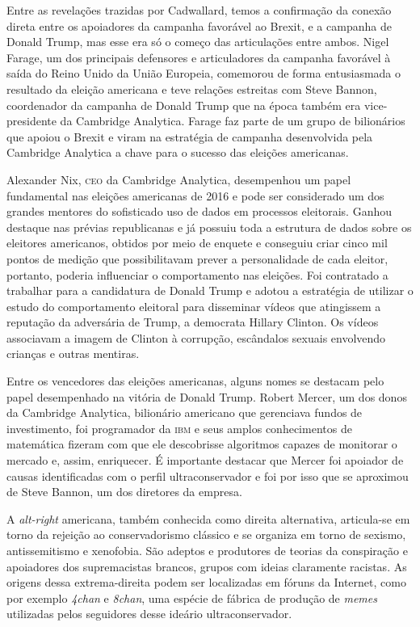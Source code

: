 Entre as revelações trazidas por Cadwallard, temos a confirmação da
conexão direta entre os apoiadores da campanha favorável ao Brexit, e a
campanha de Donald Trump, mas esse era só o começo das articulações
entre ambos. Nigel Farage, um dos principais defensores e articuladores
da campanha favorável à saída do Reino Unido da União Europeia,
comemorou de forma entusiasmada o resultado da eleição americana e teve
relações estreitas com Steve Bannon, coordenador da campanha de Donald
Trump que na época também era vice-presidente da Cambridge Analytica.
Farage faz parte de um grupo de bilionários que apoiou o Brexit e viram
na estratégia de campanha desenvolvida pela Cambridge Analytica a chave
para o sucesso das eleições americanas.

Alexander Nix, \textsc{ceo} da Cambridge Analytica, desempenhou um papel
fundamental nas eleições americanas de 2016 e pode ser considerado um
dos grandes mentores do sofisticado uso de dados em processos eleitorais.
Ganhou destaque nas prévias republicanas e já possuiu toda a estrutura
de dados sobre os eleitores americanos, obtidos por meio de enquete e
conseguiu criar cinco mil pontos de medição que possibilitavam prever a
personalidade de cada eleitor, portanto, poderia influenciar o
comportamento nas eleições. Foi contratado a trabalhar para a
candidatura de Donald Trump e adotou a estratégia de utilizar o estudo
do comportamento eleitoral para disseminar vídeos que atingissem a
reputação da adversária de Trump, a democrata Hillary Clinton. Os vídeos
associavam a imagem de Clinton à corrupção, escândalos sexuais
envolvendo crianças e outras mentiras.

Entre os vencedores das eleições americanas, alguns nomes se destacam
pelo papel desempenhado na vitória de Donald Trump. Robert Mercer, um
dos donos da Cambridge Analytica, bilionário americano que gerenciava
fundos de investimento, foi programador da \textsc{ibm} e seus amplos
conhecimentos de matemática fizeram com que ele descobrisse algoritmos
capazes de monitorar o mercado e, assim, enriquecer. É importante
destacar que Mercer foi apoiador de causas identificadas com o perfil
ultraconservador e foi por isso que se aproximou de Steve Bannon, um dos
diretores da empresa.

A \textit{alt-right} americana, também conhecida como direita alternativa,
articula-se em torno da rejeição ao conservadorismo clássico e se
organiza em torno de sexismo, antissemitismo e xenofobia. São adeptos e
produtores de teorias da conspiração e apoiadores dos supremacistas
brancos, grupos com ideias claramente racistas. As origens dessa extrema-direita podem ser localizadas em fóruns da Internet, como por exemplo
\textit{4chan} e \textit{8chan}, uma espécie de fábrica de produção de \textit{memes} utilizadas
pelos seguidores desse ideário ultraconservador.


